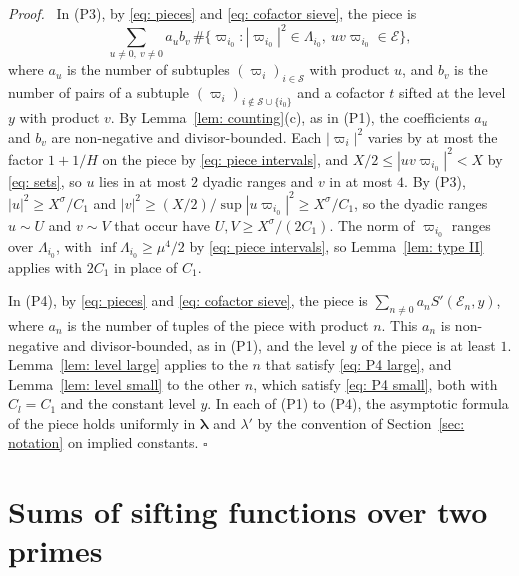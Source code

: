 \documentclass{article}
\numberwithin{equation}{section}
\newenvironment{proof}[1][Proof]{\par\medskip\noindent\textit{#1.}\ }{\hfill$\square$\par\medskip}
\newcommand{\Le}{\leqslant}
\newcommand{\Ge}{\geqslant}
\begin{document}
\begin{proof}
In (P3), by \eqref{eq: pieces} and \eqref{eq: cofactor sieve}, the piece is
\begin{equation*}
\sum_{u \neq 0,\ v \neq 0} a_u b_v\, \#\bigl\{ \varpi_{i_0} : |\varpi_{i_0}|^2 \in \Lambda_{i_0},\ uv\varpi_{i_0} \in \mathcal{E} \bigr\},
\end{equation*}
where $a_u$ is the number of subtuples $(\varpi_i)_{i \in \mathcal{S}}$ with product $u$, and $b_v$ is the number of pairs of a subtuple $(\varpi_i)_{i \notin \mathcal{S} \cup \{i_0\}}$ and a cofactor $t$ sifted at the level $y$ with product $v$. By Lemma~\ref{lem: counting}(c), as in (P1), the coefficients $a_u$ and $b_v$ are non-negative and divisor-bounded. Each $|\varpi_i|^2$ varies by at most the factor $1 + 1/H$ on the piece by \eqref{eq: piece intervals}, and $X/2 \Le |uv\varpi_{i_0}|^2 < X$ by \eqref{eq: sets}, so $u$ lies in at most $2$ dyadic ranges and $v$ in at most $4$. By (P3), $|u|^2 \Ge X^{\sigma}/C_1$ and $|v|^2 \Ge (X/2)/\sup|u\varpi_{i_0}|^2 \Ge X^{\sigma}/C_1$, so the dyadic ranges $u \sim U$ and $v \sim V$ that occur have $U, V \Ge X^{\sigma}/(2C_1)$. The norm of $\varpi_{i_0}$ ranges over $\Lambda_{i_0}$, with $\inf \Lambda_{i_0} \Ge \mu^4/2$ by \eqref{eq: piece intervals}, so Lemma~\ref{lem: type II} applies with $2C_1$ in place of $C_1$.

In (P4), by \eqref{eq: pieces} and \eqref{eq: cofactor sieve}, the piece is $\sum_{n \neq 0} a_n S'(\mathcal{E}_n, y)$, where $a_n$ is the number of tuples of the piece with product $n$. This $a_n$ is non-negative and divisor-bounded, as in (P1), and the level $y$ of the piece is at least $1$. Lemma~\ref{lem: level large} applies to the $n$ that satisfy \eqref{eq: P4 large}, and Lemma~\ref{lem: level small} to the other $n$, which satisfy \eqref{eq: P4 small}, both with $C_l = C_1$ and the constant level $y$. In each of (P1) to (P4), the asymptotic formula of the piece holds uniformly in $\boldsymbol{\lambda}$ and $\lambda'$ by the convention of Section~\ref{sec: notation} on implied constants.
\end{proof}

\section{Sums of sifting functions over two primes}
\label{sec: two primes}
\end{document}
